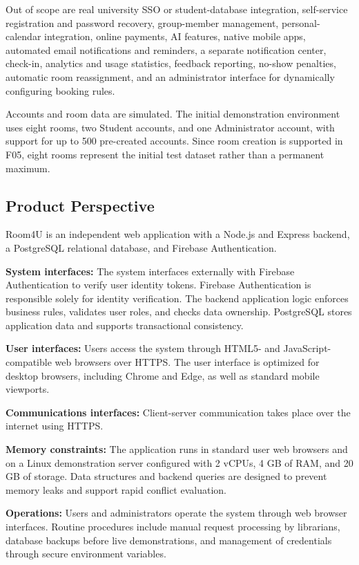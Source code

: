 Out of scope are real university SSO or student-database integration, self-service registration and password recovery, group-member management, personal-calendar integration, online payments, AI features, native mobile apps, automated email notifications and reminders, a separate notification center, check-in, analytics and usage statistics, feedback reporting, no-show penalties, automatic room reassignment, and an administrator interface for dynamically configuring booking rules.

Accounts and room data are simulated. The initial demonstration environment uses eight rooms, two Student accounts, and one Administrator account, with support for up to 500 pre-created accounts. Since room creation is supported in F05, eight rooms represent the initial test dataset rather than a permanent maximum.

\subsection{Product Perspective}
Room4U is an independent web application with a Node.js and Express backend, a PostgreSQL relational database, and Firebase Authentication.

\textbf{System interfaces:} The system interfaces externally with Firebase Authentication to verify user identity tokens. Firebase Authentication is responsible solely for identity verification. The backend application logic enforces business rules, validates user roles, and checks data ownership. PostgreSQL stores application data and supports transactional consistency.

\textbf{User interfaces:} Users access the system through HTML5- and JavaScript-compatible web browsers over HTTPS. The user interface is optimized for desktop browsers, including Chrome and Edge, as well as standard mobile viewports.

\textbf{Communications interfaces:} Client-server communication takes place over the internet using HTTPS.

\textbf{Memory constraints:} The application runs in standard user web browsers and on a Linux demonstration server configured with 2 vCPUs, 4 GB of RAM, and 20 GB of storage. Data structures and backend queries are designed to prevent memory leaks and support rapid conflict evaluation.

\textbf{Operations:} Users and administrators operate the system through web browser interfaces. Routine procedures include manual request processing by librarians, database backups before live demonstrations, and management of credentials through secure environment variables.

